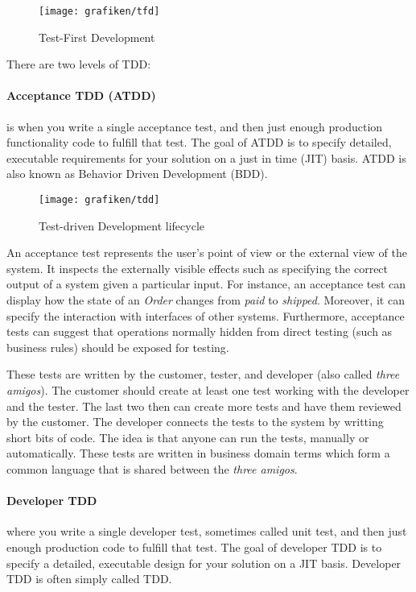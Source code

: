 \begin{figure}[H]
	\centering
    \texttt{[image: grafiken/tfd]}
    \caption{Test-First Development}
    \label{fig:tfd}
\end{figure}

There are two levels of TDD\cite{Ambler2013}:

\paragraph{Acceptance TDD (ATDD)} is when you write a single acceptance test, and then just enough production functionality code to fulfill that test. The goal of ATDD is to specify detailed, executable requirements for your solution on a just in time (JIT) basis\cite{Ambler2013}. ATDD is also known as Behavior Driven Development (BDD).

\begin{figure}[H]
	\centering
    \texttt{[image: grafiken/tdd]}
    \caption{Test-driven Development lifecycle\cite{Ambler2013}}
    \label{fig:tdd}
\end{figure}

An acceptance test represents the user's point of view or the external view of the system. It inspects the externally visible effects such as specifying the correct output of a system given a particular input. For instance, an acceptance test can display how the state of an \emph{Order} changes from \emph{paid} to \emph{shipped}. Moreover, it can specify the interaction with interfaces of other systems. Furthermore, acceptance tests can suggest that operations normally hidden from direct testing (such as business rules) should be exposed for testing\cite{KennethPugh2011}.

These tests are written by the customer, tester, and developer (also called \emph{three amigos}\cite{Dinwiddie2009}). The customer should create at least one test working with the developer and the tester. The last two then can create more tests and have them reviewed by the customer. The developer connects the tests to the system by writting short bits of code. The idea is that anyone can run the tests, manually or automatically. These tests are written in business domain terms which form a common language that is shared between the \emph{three amigos}\cite{KennethPugh2011}.

\paragraph{Developer TDD} where you write a single developer test, sometimes called unit test, and then just enough production code to fulfill that test. The goal of developer TDD is to specify a detailed, executable design for your solution on a JIT basis. Developer TDD is often simply called TDD\cite{Ambler2013}.

